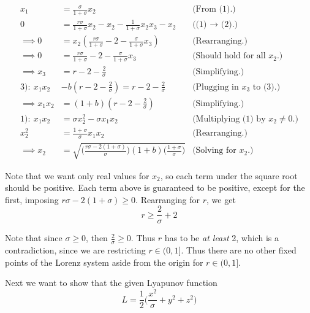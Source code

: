 \begin{solution}
\alignbreak
\begin{align}
    x_1 &= \frac{\sigma}{1 + \sigma} x_2  &\text{(From (1).)}\nonumber\\
    0 &= \frac{r\sigma}{1 + \sigma}x_2 - x_2 - \frac{1}{1 + \sigma}x_2x_3 - x_2 &\text{((1) $\rightarrow$ (2).)}\nonumber\\
    \implies 0 &= x_2(\frac{r\sigma}{1 + \sigma} - 2 - \frac{\sigma}{1 + \sigma}x_3) &\text{(Rearranging.)}\nonumber\\
    \implies 0 &= \frac{r\sigma}{1 + \sigma} - 2 - \frac{\sigma}{1 + \sigma}x_3&\text{(Should hold for all $x_2$.)}\nonumber\\
    \implies x_3 &= r - 2 - \frac{2}{\sigma} &\text{(Simplifying.)}\nonumber\\
    3) : \ x_1x_2 &- b(r - 2 - \frac{2}{\sigma}) = r - 2 - \frac{2}{\sigma} &\text{(Plugging in $x_3$ to (3).)}\nonumber\\
    \implies x_1x_2 &= (1 + b)(r - 2 - \frac{2}{\sigma}) &\text{(Simplifying.)}\nonumber\\
    1) : \ x_1x_2 &= \sigma x_2^2 - \sigma x_1x_2 &\text{(Multiplying (1) by $x_2 \neq 0$.)}\nonumber\\
    x_2^2 &= \frac{1+\sigma}{\sigma} x_1x_2 &\text{(Rearranging.)}\nonumber\\
    \implies x_2 &= \sqrt{\Big(\frac{r\sigma - 2(1 + \sigma)}{\sigma}\Big)(1 + b)\Big(\frac{1+\sigma}{\sigma}\Big)} &\text{(Solving for $x_2$.)}\nonumber
\end{align}
\alignbreak

Note that we want only real values for $x_2$, so each term under the square root should be positive. Each term above is guaranteed to be positive, except for the first, imposing $r\sigma - 2(1 + \sigma) \geq 0$. Rearranging for $r$, we get
\[
r \geq \frac{2}{\sigma} + 2
\]

Note that since $\sigma \geq 0$, then $\frac{2}{\sigma} \geq 0$. Thus $r$ has to be \textit{at least} 2, which is a contradiction, since we are restricting $r \in (0, 1]$. Thus there are no other fixed points of the Lorenz system aside from the origin for $r \in (0, 1]$.\par

\newpage
Next we want to show that the given Lyapunov function
\[
L = \frac{1}{2}\Big( \frac{x^2}{\sigma} + y^2 + z^2\Big)
\]


\end{solution}
